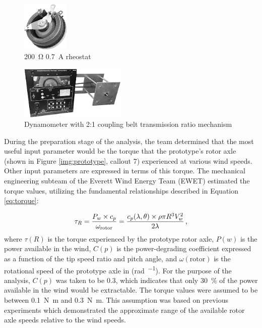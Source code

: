 \documentclass[11pt,letterpaper,conference]{IEEEtran}
\begin{document}
\begin{figure}[th]
    \centering
    \includegraphics[width=0.2\textwidth]{images/rheostat.png}
    \caption{\qty{200}{\ohm} \qty{0.7}{\A} rheostat}
    \label{img:rheostat}
\end{figure}
\begin{figure}[th]
    \centering
    \includegraphics[width=0.45\textwidth]{images/dyno.png}
    \caption{Dynamometer with 2:1 coupling belt transmission ratio mechanism}
    \label{img:dyno}
\end{figure}

During the preparation stage of the analysis, the team determined that the most
useful input parameter would be the torque that the prototype's rotor axle
(shown in Figure \ref{img:prototype}, callout 7) experienced at various wind
speeds. Other input parameters are expressed in terms of this torque. The
mechanical engineering subteam of the Everett Wind Energy Team (EWET)
estimated the torque values, utilizing the fundamental relationships described
in Equation \eqref{eq:torque}:

\begin{equation}
    \label{eq:torque}
    \tau_R = \frac{P_w \times c_p}{\omega_\text{rotor}}
    = \frac{c_p(\lambda, \theta) \times \rho \pi R^3 V_w^2}{2\lambda}
    \text{\,,}
\end{equation}
where $\tau(R)$ is the torque experienced by the prototype rotor axle,
$P(w)$ is the power available in the wind, $C(p)$ is the power-degrading
coefficient expressed as a function of the tip speed ratio and pitch angle,
and $\omega(\text{rotor})$ is the rotational speed of the prototype axle in
(\unit{\radian\per\sec}). For the purpose of the analysis, $C(p)$ was taken to
be \num{0.3}, which indicates that only \qty{30}{\percent} of the power
available in the wind would be extractable. The torque values were assumed to
be between \qty{.1}{\newton\m} and \qty{.3}{\newton\m}. This assumption was
based on previous experiments which demonstrated the approximate range of the
available rotor axle speeds relative to the wind speeds.
\end{document}

